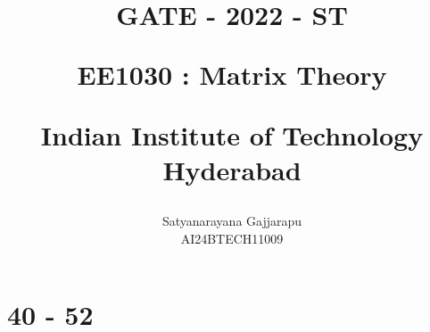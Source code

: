 \documentclass[journal]{IEEEtran}
\begin{document}

\vspace{3cm}




\title{
GATE - 2022 - ST

\large{EE1030 : Matrix Theory}

Indian Institute of Technology Hyderabad
}
\author{Satyanarayana Gajjarapu

AI24BTECH11009
}	





\maketitle




\bigskip

\renewcommand{\thefigure}{\theenumi}
\renewcommand{\thetable}{\theenumi}


\section{40 - 52}
\end{document}
